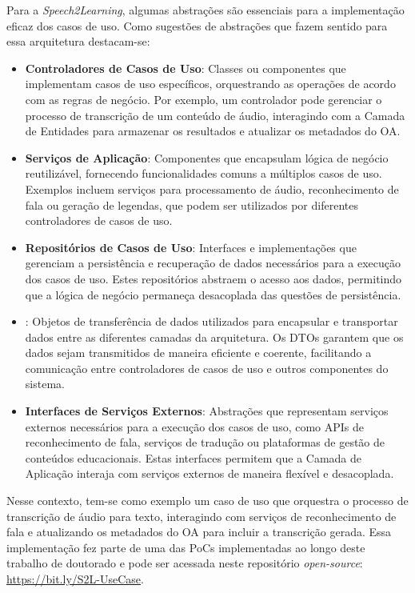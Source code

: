 Para a \textit{Speech2Learning}, algumas abstrações são essenciais para a implementação eficaz dos casos de uso. Como sugestões de abstrações que fazem sentido para essa arquitetura destacam-se:

\begin{itemize}
    \item \textbf{Controladores de Casos de Uso}: Classes ou componentes que implementam casos de uso específicos, orquestrando as operações de acordo com as regras de negócio. Por exemplo, um controlador pode gerenciar o processo de transcrição de um conteúdo de áudio, interagindo com a Camada de Entidades para armazenar os resultados e atualizar os metadados do OA.

    \item \textbf{Serviços de Aplicação}: Componentes que encapsulam lógica de negócio reutilizável, fornecendo funcionalidades comuns a múltiplos casos de uso. Exemplos incluem serviços para processamento de áudio, reconhecimento de fala ou geração de legendas, que podem ser utilizados por diferentes controladores de casos de uso.

    \item \textbf{Repositórios de Casos de Uso}: Interfaces e implementações que gerenciam a persistência e recuperação de dados necessários para a execução dos casos de uso. Estes repositórios abstraem o acesso aos dados, permitindo que a lógica de negócio permaneça desacoplada das questões de persistência.

    \item \textbf{}: Objetos de transferência de dados utilizados para encapsular e transportar dados entre as diferentes camadas da arquitetura. Os DTOs garantem que os dados sejam transmitidos de maneira eficiente e coerente, facilitando a comunicação entre controladores de casos de uso e outros componentes do sistema.

    \item \textbf{Interfaces de Serviços Externos}: Abstrações que representam serviços externos necessários para a execução dos casos de uso, como APIs de reconhecimento de fala, serviços de tradução ou plataformas de gestão de conteúdos educacionais. Estas interfaces permitem que a Camada de Aplicação interaja com serviços externos de maneira flexível e desacoplada.
\end{itemize}

Nesse contexto, tem-se como exemplo um caso de uso que orquestra o processo de transcrição de áudio para texto, interagindo com serviços de reconhecimento de fala e atualizando os metadados do OA para incluir a transcrição gerada. Essa implementação fez parte de uma das PoCs implementadas ao longo deste trabalho de doutorado e pode ser acessada neste repositório \textit{open-source}: \url{https://bit.ly/S2L-UseCase}.

